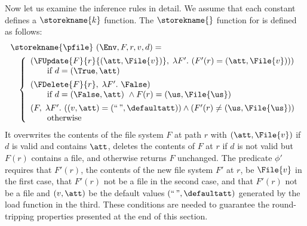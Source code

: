 Now let us examine the inference rules in detail. We assume that each
constant defines a $\storekname{k}$ function. The $\storekname{}$
function for \pfile{} is defined as follows:
%
\[
\begin{array}{l}
\storekname{\pfile}~(\Env,F,r,v,d) =\\[1ex]
\quad 
\left\{
\begin{array}{ll}
  (\FUpdate{F}{r}{(\att,\File{v})},            
  \; \lambda F'.~ (F'(r) = (\att,\File{v})))\\
  \qquad\text{if}~d = (\True,\att)\\[1ex]
  (\FDelete{F}{r},                             
  \; \lambda F'.~\False) \\
  \qquad\text{if}~d = (\False,\att)~\wedge F(r) = (\us,\File{\us})\\[1ex]
  (F,              
  \; \lambda F'.~ ((v,\att) = (\text{``}{\,}\text{''},\defaultatt)) \wedge (F'(r) \neq (\us,\File{\us}))\\
  \qquad\text{otherwise}
\end{array}\right.
\end{array}\]
%
It overwrites the contents of the file system $F$ at path $r$ with
$(\att,\File{v})$ if $d$ is valid and contains $\att$, deletes the
contents of $F$ at $r$ if $d$ is not valid but $F(r)$ contains a file,
and otherwise returns $F$ unchanged. The predicate $\phi'$ requires
that $F'(r)$, the contents of the new file system $F'$ at $r$, be
$\File{v}$ in the first case, that $F'(r)$ not be a file in the second
case, and that $F'(r)$ not be a file and $(v,\att)$ be the default
values $(\text{``}{\,}\text{''}, \defaultatt)$ generated by the load
function in the third. These conditions are needed to guarantee the
round-tripping properties presented at the end of this section.

